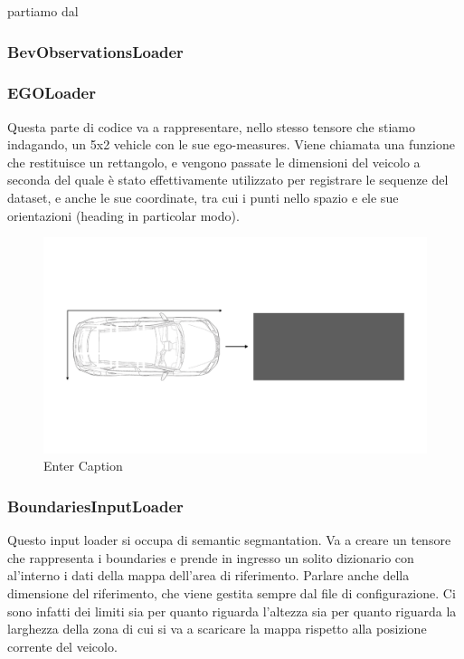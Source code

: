 partiamo dal

\subsubsection{BevObservationsLoader}



\subsubsection{EGOLoader}
Questa parte di codice va a rappresentare, nello stesso tensore che stiamo indagando, un 5x2 vehicle con le sue ego-measures. 
Viene chiamata una funzione che restituisce un rettangolo, e vengono passate le dimensioni del veicolo a seconda del quale è stato effettivamente utilizzato per registrare le sequenze del dataset, e anche le sue coordinate, tra cui i punti nello spazio e ele sue orientazioni (heading in particolar modo). 

\begin{figure}
    \centering
    \includegraphics[width=0.75\linewidth]{LateX//figs/egoLoader.pdf}
    \caption{Enter Caption}
    \label{fig:enter-label}
\end{figure}

\subsubsection{BoundariesInputLoader}
Questo input loader si occupa di semantic segmantation. Va a creare un tensore che rappresenta i boundaries e prende in ingresso un solito dizionario con al'interno i dati della mappa dell'area di riferimento. Parlare anche della dimensione del riferimento, che viene gestita sempre dal file di configurazione. Ci sono infatti dei limiti sia per quanto riguarda l'altezza sia per quanto riguarda la larghezza della zona di cui si va a scaricare la mappa rispetto alla posizione corrente del veicolo. 


